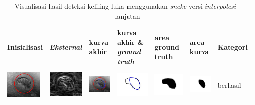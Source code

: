 \begin{table}[H]
	\centering
	\caption{Visualisasi hasil deteksi keliling luka menggunakan \emph{snake} versi \emph{interpolasi} - lanjutan}
	\label{tabel_hasil_10_interp}
	\begin{tabular}{|m{0.7in}|m{0.7in}|m{0.7in}|m{0.7in}|m{0.7in}|m{0.7in}|m{0.7in}|}
		\hline
		\textbf{Inisialisasi} & \textbf{\emph{Eksternal}} & \textbf{kurva akhir} & \textbf{kurva akhir \& \emph{ground truth}}& \textbf{area ground truth} & \textbf{area kurva} & \textbf{Kategori} \\
		\hline
		
		&  &  & & & &  \\
		\includegraphics[width=0.7in]{dataset/dataset_3/luka_merah/ready/32_interp_init.jpg}&
		\includegraphics[width=0.7in]{dataset/dataset_3/luka_merah/ready/32_interp_ext.jpg}&
		\includegraphics[width=0.7in]{dataset/dataset_3/luka_merah/ready/32_interp_result.jpg}&
		\includegraphics[width=0.7in]{dataset/dataset_3/luka_merah/ready/32_gt_r.jpg}&
		\includegraphics[width=0.7in]{dataset/dataset_3/luka_merah/ready/32_r.jpg}&
		\includegraphics[width=0.7in]{dataset/dataset_3/luka_merah/ready/32_interp_r.jpg}&
		berhasil\\
		\hline
		

\end{tabular}
\end{table}
